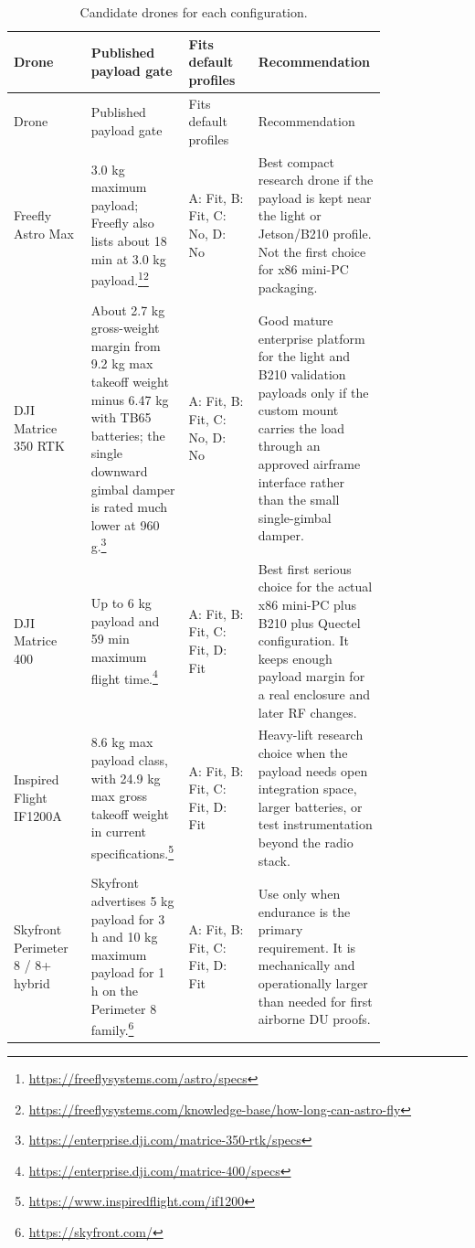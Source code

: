 \documentclass[11pt]{article}
\newcommand{\fit}{\textcolor{green!45!black}{Fit}}
\newcommand{\nofit}{\textcolor{red!70!black}{No}}
\begin{document}
\begin{longtable}{p{0.20\linewidth}p{0.16\linewidth}p{0.18\linewidth}p{0.27\linewidth}}
\caption{Candidate drones for each configuration.}\\
\toprule
Drone & Published payload gate & Fits default profiles & Recommendation \\
\midrule
\endfirsthead
\toprule
Drone & Published payload gate & Fits default profiles & Recommendation \\
\midrule
\endhead
Freefly Astro Max & 3.0 kg maximum payload; Freefly also lists about 18 min at 3.0 kg payload.\footnote{\url{https://freeflysystems.com/astro/specs}}\footnote{\url{https://freeflysystems.com/knowledge-base/how-long-can-astro-fly}} &
A: \fit, B: \fit, C: \nofit, D: \nofit &
Best compact research drone if the payload is kept near the light or Jetson/B210 profile. Not the first choice for x86 mini-PC packaging. \\
DJI Matrice 350 RTK & About 2.7 kg gross-weight margin from 9.2 kg max takeoff weight minus 6.47 kg with TB65 batteries; the single downward gimbal damper is rated much lower at 960 g.\footnote{\url{https://enterprise.dji.com/matrice-350-rtk/specs}} &
A: \fit, B: \fit, C: \nofit, D: \nofit &
Good mature enterprise platform for the light and B210 validation payloads only if the custom mount carries the load through an approved airframe interface rather than the small single-gimbal damper. \\
DJI Matrice 400 & Up to 6 kg payload and 59 min maximum flight time.\footnote{\url{https://enterprise.dji.com/matrice-400/specs}} &
A: \fit, B: \fit, C: \fit, D: \fit &
Best first serious choice for the actual x86 mini-PC plus B210 plus Quectel configuration. It keeps enough payload margin for a real enclosure and later RF changes. \\
Inspired Flight IF1200A & 8.6 kg max payload class, with 24.9 kg max gross takeoff weight in current specifications.\footnote{\url{https://www.inspiredflight.com/if1200}} &
A: \fit, B: \fit, C: \fit, D: \fit &
Heavy-lift research choice when the payload needs open integration space, larger batteries, or test instrumentation beyond the radio stack. \\
Skyfront Perimeter 8 / 8+ hybrid & Skyfront advertises 5 kg payload for 3 h and 10 kg maximum payload for 1 h on the Perimeter 8 family.\footnote{\url{https://skyfront.com/}} &
A: \fit, B: \fit, C: \fit, D: \fit &
Use only when endurance is the primary requirement. It is mechanically and operationally larger than needed for first airborne DU proofs. \\
\bottomrule
\end{longtable}
\end{document}

